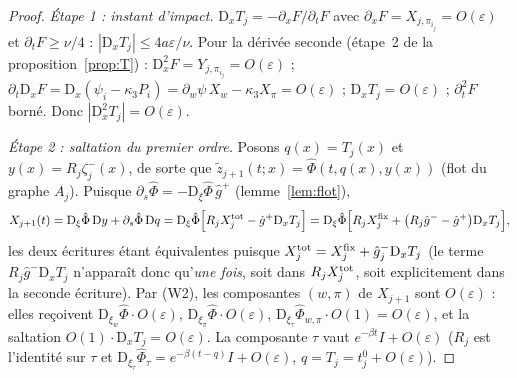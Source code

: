 \documentclass[11pt,a4paper]{article}
\theoremstyle{remark}
\theoremstyle{definition}
\newcommand{\eps}{\varepsilon}
\newcommand{\zt}{\widetilde z}
\newcommand{\D}{\mathrm D}
\begin{document}
\begin{proof}
\emph{Étape 1 : instant d'impact.} $\D_xT_j=-\partial_xF/\partial_tF$ avec $\partial_xF=X_{j,\pi_{i_j}}=O(\eps)$ et $\partial_tF\ge\nu/4$ : $|\D_xT_j|\le4a\eps/\nu$. Pour la dérivée seconde (étape~2 de la proposition~\ref{prop:T}) : $\D_x^2F=Y_{j,\pi_{i_j}}=O(\eps)$ ; $\partial_t\D_xF=\D_x(\psi_i-\kappa_3P_i)=\partial_w\psi\,X_w-\kappa_3X_\pi=O(\eps)$ ; $\D_xT_j=O(\eps)$ ; $\partial_t^2F$ borné. Donc $|\D_x^2T_j|=O(\eps)$.

\emph{Étape 2 : saltation du premier ordre.} Posons $q(x)=T_j(x)$ et $y(x)=R_j\zeta^-_j(x)$, de sorte que $\zt_{j+1}(t;x)=\hat\Phi(t,q(x),y(x))$ (flot du graphe $A_j$). Puisque $\partial_s\hat\Phi=-\D_\xi\hat\Phi\,\hat g^+$ (lemme~\ref{lem:flot}),
\[
X_{j+1}(t)=\D_\xi\hat\Phi\,\D y+\partial_s\hat\Phi\,\D q
=\D_\xi\hat\Phi\Bigl[R_jX^{\rm tot}_j-\hat g^+\D_xT_j\Bigr]
=\D_\xi\hat\Phi\Bigl[R_jX^{\rm fix}_j+\bigl(R_j\hat g^--\hat g^+\bigr)\D_xT_j\Bigr],
\]
les deux écritures étant équivalentes puisque $X^{\rm tot}_j=X^{\rm fix}_j+\hat g^-_j\D_xT_j$ (le terme $R_j\hat g^-\D_xT_j$ n'apparaît donc qu'\emph{une fois}, soit dans $R_jX^{\rm tot}_j$, soit explicitement dans la seconde écriture). Par (W2), les composantes $(w,\pi)$ de $X_{j+1}$ sont $O(\eps)$ : elles reçoivent $\D_{\xi_w}\hat\Phi\cdot O(\eps)$, $\D_{\xi_\pi}\hat\Phi\cdot O(\eps)$, $\D_{\xi_\tau}\hat\Phi_{w,\pi}\cdot O(1)=O(\eps)$, et la saltation $O(1)\cdot\D_xT_j=O(\eps)$. La composante $\tau$ vaut $e^{-\beta t}I+O(\eps)$ ($R_j$ est l'identité sur $\tau$ et $\D_{\xi_\tau}\hat\Phi_\tau=e^{-\beta(t-q)}I+O(\eps)$, $q=T_j=t_j^0+O(\eps)$).


\end{proof}
\end{document}
